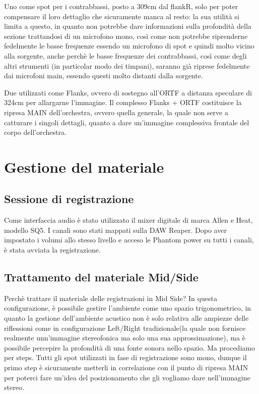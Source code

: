 Uno come spot per i contrabbassi, posto a 309cm dal flankR, solo per poter compensare il loro dettaglio che sicuramente manca al resto: la sua utilità si limita a questo, in quanto non potrebbe dare informazioni sulla profondità della sezione trattandosi di un microfono mono, così come non potrebbe riprenderne fedelmente le basse frequenze essendo un microfono di spot e quindi molto vicino alla sorgente, anche perchè le basse frequenze dei contrabbassi, così come degli altri strumenti (in particolar modo dei timpani), saranno già riprese fedelmente dai microfoni main, essendo questi molto distanti dalla sorgente.

Due utilizzati come Flanks, ovvero di sostegno all'ORTF a distanza speculare di 324cm per allargarne l'immagine. Il complesso Flanks + ORTF costituisce la ripresa MAIN dell'orchestra, ovvero quella generale, la quale non serve a catturare i singoli dettagli, quanto a dare un'immagine complessiva frontale del corpo dell'orchestra.


\section*{Gestione del materiale}

\subsection*{Sessione di registrazione}
Come interfaccia audio è stato utilizzato il mixer digitale di marca Allen e Heat, modello SQ5. I canali sono stati mappati sulla DAW Reaper. Dopo aver impostato i volumi allo stesso livello e acceso le Phantom power su tutti i canali, è stata avviata la registrazione. 

\subsection*{Trattamento del materiale Mid/Side}
Perchè trattare il materiale delle registrazioni in Mid Side? In questa configurazione, è possibile gestire l'ambiente come uno spazio trigonometrico, in quanto la gestione dell'ambiente acustico non è solo relativa alle ampiezze delle riflessioni come in configurazione Left/Right tradizionale(la quale non fornisce realmente unn'immagine stereofonica ma solo una sua approssimazione), ma è possibile percepire la profondità di una fonte sonora nello spazio.
Ma procediamo per steps.
Tutti gli spot utilizzati in fase di registrazione sono mono, dunque il primo step è sicuramente metterli in correlazione con il punto di ripresa MAIN per poterci fare un'idea del posizionamento che  gli vogliamo dare nell'immagine stereo.


